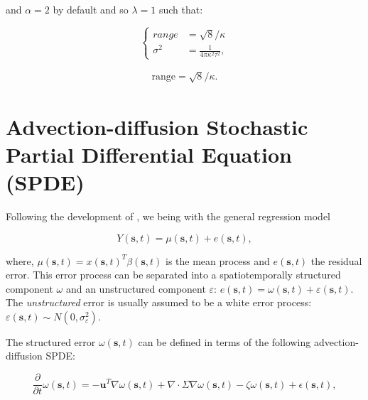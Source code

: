 \documentclass[letterpaper,portrait,11pt]{scrartcl}
\numberwithin{equation}{section}    %
\numberwithin{figure}{section}    %
\numberwithin{table}{section}       %
\begin{document}
\begin{appendices}
and $\alpha=2$ by default and so $\lambda=1$ such that:


\begin{equation}
\label{eq:inlaRange}
\begin{cases}
  range    &=  \sqrt{8} / \kappa \\
  \sigma^2 &=  \frac{1}{4 \pi \kappa^2 \tau^2 },
\end{cases}
\end{equation}
 

\begin{eqnarray*}
\text{range} = \sqrt{8} / \kappa .
\end{eqnarray*} 





\section{Advection-diffusion Stochastic Partial Differential Equation (SPDE)}
\label{advectionDiffsionSPDEsolution}



Following the development of \textcite{sigrist2015stochastic}, we being with the general regression model

\begin{equation}
Y(\bm{s},t) = \mu(\bm{s},t) + e(\bm{s},t) ,
\end{equation}

where, $\mu(\bm{s},t) = x(\bm{s},t)^{T} \beta(\bm{s},t)$ is the mean process and $e(\bm{s},t)$ the residual error. This error process can be separated into a spatiotemporally structured component $\omega$ and an unstructured component $\varepsilon$: $e(\bm{s},t) = \omega(\bm{s},t) +  \varepsilon(\bm{s},t)$. The \textit{unstructured} error is usually assumed to be a white error process: $\varepsilon(\bm{s},t) \sim N(0, \sigma^2_\varepsilon)$. 

The structured error $\omega(\bm{s},t)$ can be defined in terms of the following advection-diffusion SPDE:

\begin{equation}
\frac{\partial}{\partial t} \omega(\bm{s},t) = - \bm{u}^T \nabla \omega(\bm{s},t)
+ \nabla \cdotp \Sigma \nabla \omega(\bm{s},t) - \zeta  \omega(\bm{s},t) + \epsilon(\bm{s},t),
\end{equation}


\end{appendices}
\end{document}
